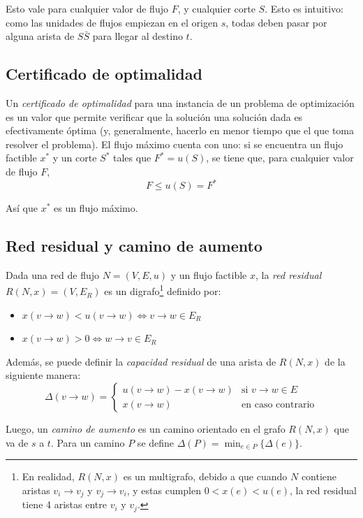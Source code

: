 \documentclass[a4paper]{report}
\newcommand{\si}{\text{si }}
\newcommand{\ecc}{\text{en caso contrario}}
\begin{document}
Esto vale para cualquier valor de flujo $F$, y cualquier corte $S$. Esto es intuitivo: como las unidades de flujos empiezan en el origen $s$, todas deben pasar por alguna arista de $S\bar{S}$ para llegar al destino $t$.

\subsection{Certificado de optimalidad}
\label{flujo-certificado-optimalidad}

Un \textit{certificado de optimalidad} para una instancia de un problema de optimización es un valor que permite verificar que la solución una solución dada es efectivamente óptima (y, generalmente, hacerlo en menor tiempo que el que toma resolver el problema). El flujo máximo cuenta con uno: si se encuentra un flujo factible $x^*$ y un corte $S^*$ tales que $F^* = u(S)$, se tiene que, para cualquier valor de flujo $F$,
$$F \leq u(S) = F^*$$

Así que $x^*$ es un flujo máximo.

\subsection{Red residual y camino de aumento}

Dada una red de flujo $N = (V, E, u)$ y un flujo factible $x$, la \textit{red residual} $R(N, x) = (V, E_R)$ es un digrafo\footnote{En realidad, $R(N, x)$ es un multigrafo, debido a que cuando $N$ contiene aristas $v_i \rightarrow v_j$ y $v_j \rightarrow v_i$, y estas cumplen $0 < x(e) < u(e)$, la red residual tiene 4 aristas entre $v_i$ y $v_j$.} definido por:
\begin{itemize}
    \item $x(v \rightarrow w) < u(v \rightarrow w) \iff v \rightarrow w \in E_R$
    \item $x(v \rightarrow w) > 0 \iff w \rightarrow v \in E_R$
\end{itemize}

Además, se puede definir la \textit{capacidad residual} de una arista de $R(N, x)$ de la siguiente manera:
$$
    \Delta(v \rightarrow w) =
    \begin{cases}
        u(v \rightarrow w) - x(v \rightarrow w) & \si v \rightarrow w \in E \\
        x(v \rightarrow w)                      & \ecc
    \end{cases}
$$

Luego, un \textit{camino de aumento} es un camino orientado en el grafo $R(N, x)$ que va de $s$ a $t$. Para un camino $P$ se define $\Delta(P) = \min_{e \in P}{\{\Delta(e)\}}$.
\end{document}

